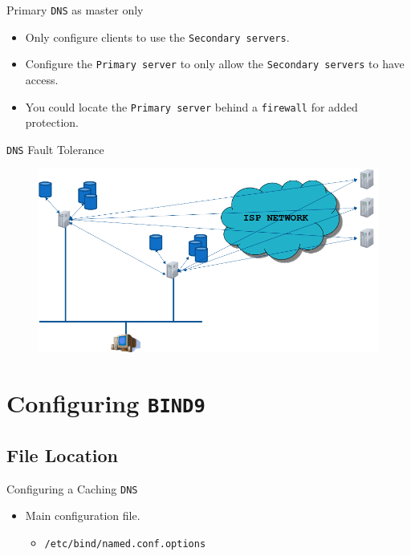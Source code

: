 \documentclass{beamer}
\begin{document}
\begin{frame}{Primary \texttt{DNS} as master only}
  \begin{tcolorbox}[title={\textbf{SECURITY:}}]
    \begin{itemize}
      \item Only configure clients to use the \texttt{Secondary servers}.
      \item Configure the \texttt{Primary server} to only allow the \texttt{Secondary servers} to have access.
      \item You could locate the \texttt{Primary server} behind a \texttt{firewall} for added protection.  
    \end{itemize}
  \end{tcolorbox}
\end{frame}

\begin{frame}{\texttt{DNS} Fault Tolerance}
  \begin{figure}
    \begin{center}
      \includegraphics[width=1\linewidth]{faulttolerance.png}
    \end{center}
  \end{figure}
\end{frame}

\section{Configuring \texttt{BIND9}}
\subsection{File Location}
\begin{frame}{Configuring a Caching \texttt{DNS}}
  \begin{itemize}
    \item Main configuration file.
      \begin{itemize}
        \item \texttt{/etc/bind/named.conf.options}
      \end{itemize}
  \end{itemize}
\end{frame}
\end{document}
